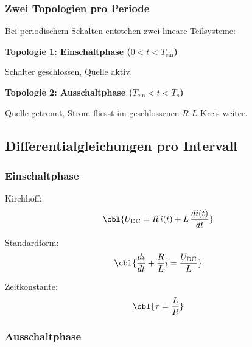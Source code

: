 \subsubsection{Zwei Topologien pro Periode}

Bei periodischem Schalten entstehen zwei lineare Teilsysteme:

\medskip
\textbf{Topologie 1: Einschaltphase ($0 < t < T_{\mathrm{ein}}$)}

\begin{center}
\end{center}

Schalter geschlossen, Quelle aktiv.

\medskip
\textbf{Topologie 2: Ausschaltphase ($T_{\mathrm{ein}} < t < T_s$)}

\begin{center}
\end{center}

Quelle getrennt, Strom fliesst im geschlossenen $R$-$L$-Kreis weiter.

\subsection{Differentialgleichungen pro Intervall}

\subsubsection{Einschaltphase}

Kirchhoff:
\[
\cbl{U_{\mathrm{DC}} = R\,i(t) + L\,\frac{di(t)}{dt}}
\]

Standardform:
\[
\cbl{\frac{di}{dt} + \frac{R}{L} i = \frac{U_{\mathrm{DC}}}{L}}
\]

Zeitkonstante:
\[
\cbl{\tau = \frac{L}{R}}
\]

\subsubsection{Ausschaltphase}

